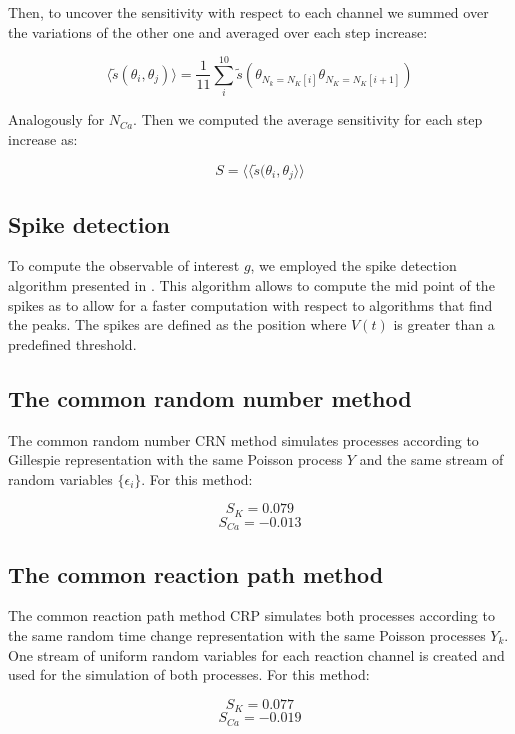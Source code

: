 Then, to uncover the sensitivity with respect to each channel we summed over the variations of the other one and averaged over each step increase:

$$\langle\tilde{s}(\theta_i, \theta_j)\rangle = \frac{1}{11}\sum\limits_{i}^{10}\tilde{s}(\theta_{N_k = N_K[i]}\theta_{N_K= N_K[i+1]})$$

Analogously for $N_{Ca}$.
Then we computed the average sensitivity for each step increase as:

$$S = \langle\langle\tilde{s}(\theta_i,\theta_j\rangle\rangle$$

	\subsection{Spike detection}
	To compute the observable of interest $g$, we employed the spike detection algorithm presented in \cite{spike-detection}.
	This algorithm allows to compute the mid point of the spikes as to allow for a faster computation with respect to algorithms that find the peaks.
	The spikes are defined as the position where $V(t)$ is greater than a predefined threshold.

	\subsection{The common random number method}
	The common random number CRN method simulates processes according to Gillespie representation with the same Poisson process $Y$ and the same stream of random variables $\{\epsilon_i\}$. For this method:

	$$S_{K} = 0.079$$
	$$S_{Ca} = -0.013$$ 
	
 	\subsection{The common reaction path method}
	The common reaction path method CRP simulates both processes according to the same random time change representation with the same Poisson processes $Y_k$.
	One stream of uniform random variables for each reaction channel is created and used for the simulation of both processes. For this method: 

	
	$$S_{K} = 0.077$$
	$$S_{Ca} = -0.019$$ 

